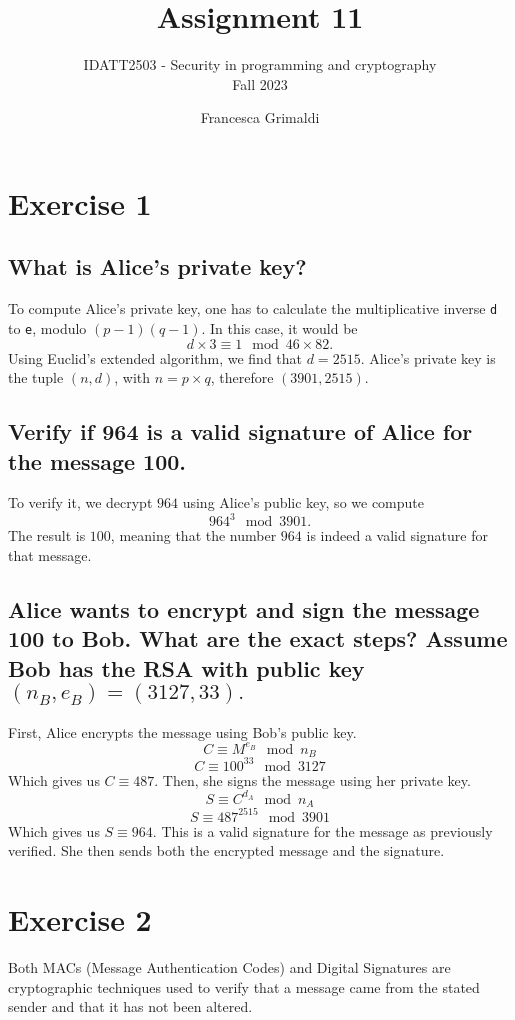 \documentclass{article}
\title{%
    \huge Assignment 11}
\subtitle{%
    IDATT2503 - Security in programming and cryptography \\
    Fall 2023
    }
\author{%
  Francesca Grimaldi
}
\date{}
\begin{document}
\maketitle



\section{Exercise 1}
\subsection{What is Alice's private key?}
To compute Alice's private key, one has to calculate the multiplicative inverse \texttt{d} to \texttt{e}, modulo \((p-1)(q-1)\).
In this case, it would be
\[d \times 3 \equiv 1 \mod 46 \times 82. \]
Using Euclid's extended algorithm, we find that \(d = 2515\).
Alice's private key is the tuple \((n, d)\), with \(n = p \times q\), therefore \((3901, 2515)\).

\subsection{Verify if 964 is a valid signature of Alice for the message 100.}
To verify it, we decrypt \(964\) using Alice's public key, so we compute
\[964^3 \mod 3901.\]
The result is \(100\), meaning that the number \(964\) is indeed a valid signature for that message.

\subsection{Alice wants to encrypt and sign the message 100 to Bob. What are the exact steps?
Assume Bob has the RSA with public key \((n_B, e_B) = (3127, 33).\)}
First, Alice encrypts the message using Bob's public key.
\[C \equiv M^{e_B} \mod n_B\]
\[C \equiv 100^{33} \mod 3127\]
Which gives us \(C \equiv 487\).
Then, she signs the message using her private key.
\[S \equiv C^{d_A} \mod n_A\]
\[S \equiv 487^{2515} \mod 3901\]
Which gives us \(S \equiv 964\).
This is a valid signature for the message as previously verified.
She then sends both the encrypted message and the signature.

\section{Exercise 2}
Both MACs (Message Authentication Codes) and Digital Signatures are cryptographic techniques used to verify that a message came from the stated sender and that it has not been altered.
\end{document}
